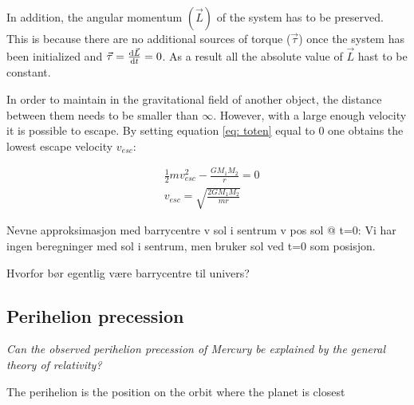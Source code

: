  In addition, the angular momentum $ (\vec{L}) $ of the system has to be preserved. This is because there are no additional sources of torque ($ \vec{\tau} $) once the system has been initialized and $ \vec{\tau} = \dv{{\vec{L}}}{t} =0$. As a result all the absolute value of $ \vec{L} $ hast to be constant. 

In order to maintain in the gravitational field of another object, the distance between them needs to be smaller than $ \infty $. However, with a large enough velocity it is possible to escape. By setting  equation \ref{eq: toten} equal to $ 0 $ one obtains the lowest escape velocity $ v_{esc} $: 


\begin{align}
&\frac{1}{2}mv_{esc}^2 - \frac{G	M_1M_2}{r}  = 0\\
& v_{esc} = \sqrt{ \frac{2G	M_1M_2}{mr}}
\end{align}








Nevne approksimasjon med barrycentre v sol i sentrum v pos sol @ t=0:
Vi har ingen beregninger med sol i sentrum, men bruker sol ved t=0 som posisjon. 

Hvorfor bør egentlig være barrycentre til univers?

\subsection{Perihelion precession}
\textit{Can the observed perihelion precession of Mercury be explained by the general theory of relativity?}

The perihelion is the position on the orbit where the planet is closest



